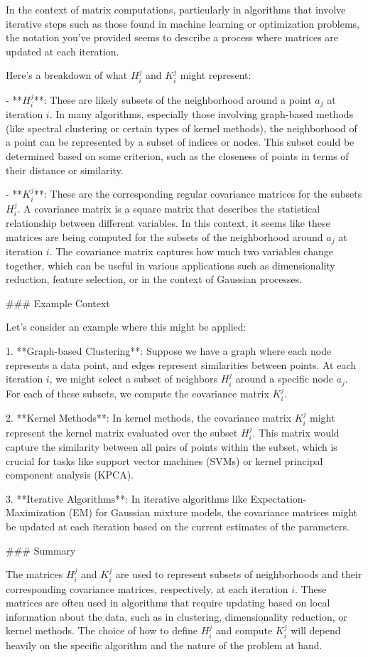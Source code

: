 In the context of matrix computations, particularly in algorithms that involve iterative steps such as those found in machine learning or optimization problems, the notation you've provided seems to describe a process where matrices are updated at each iteration.

Here's a breakdown of what \(H_i^j\) and \(K_i^j\) might represent:

- **\(H_i^j\)**: These are likely subsets of the neighborhood around a point \(a_j\) at iteration \(i\). In many algorithms, especially those involving graph-based methods (like spectral clustering or certain types of kernel methods), the neighborhood of a point can be represented by a subset of indices or nodes. This subset could be determined based on some criterion, such as the closeness of points in terms of their distance or similarity.

- **\(K_i^j\)**: These are the corresponding regular covariance matrices for the subsets \(H_i^j\). A covariance matrix is a square matrix that describes the statistical relationship between different variables. In this context, it seems like these matrices are being computed for the subsets of the neighborhood around \(a_j\) at iteration \(i\). The covariance matrix captures how much two variables change together, which can be useful in various applications such as dimensionality reduction, feature selection, or in the context of Gaussian processes.

### Example Context

Let's consider an example where this might be applied:

1. **Graph-based Clustering**: Suppose we have a graph where each node represents a data point, and edges represent similarities between points. At each iteration \(i\), we might select a subset of neighbors \(H_i^j\) around a specific node \(a_j\). For each of these subsets, we compute the covariance matrix \(K_i^j\).

2. **Kernel Methods**: In kernel methods, the covariance matrix \(K_i^j\) might represent the kernel matrix evaluated over the subset \(H_i^j\). This matrix would capture the similarity between all pairs of points within the subset, which is crucial for tasks like support vector machines (SVMs) or kernel principal component analysis (KPCA).

3. **Iterative Algorithms**: In iterative algorithms like Expectation-Maximization (EM) for Gaussian mixture models, the covariance matrices might be updated at each iteration based on the current estimates of the parameters.

### Summary

The matrices \(H_i^j\) and \(K_i^j\) are used to represent subsets of neighborhoods and their corresponding covariance matrices, respectively, at each iteration \(i\). These matrices are often used in algorithms that require updating based on local information about the data, such as in clustering, dimensionality reduction, or kernel methods. The choice of how to define \(H_i^j\) and compute \(K_i^j\) will depend heavily on the specific algorithm and the nature of the problem at hand.